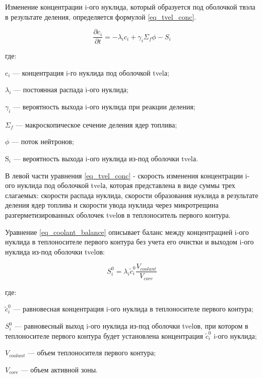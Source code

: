 Изменение концентрации i-ого нуклида, который образуется под оболочкой твэла в результате деления, определяется формулой 
\ref{eq_tvel_conc}.

\begin{equation}
    \label{eq_tvel_conc}
    \frac{\partial c_{i}}{\partial t} = -\lambda_{i}c_{i} + \gamma_{i}\Sigma_{f}\phi - S_{i}
\end{equation}

где:
\begin{description}
    \item $\text{c}_i$ --- концентрация i-го нуклида под оболочкой \ac{tvel}а;
    \item $\lambda_{i}$ ---  постоянная распада i-ого нуклида;
    \item $\gamma_{i}$ --- вероятность выхода i-ого нуклида при реакции деления;
    \item $\Sigma_{f}$ --- макроскопическое сечение деления ядер топлива;
    \item $\phi$ --- поток нейтронов;
    \item $\text{S}_{i}$ --- вероятность выхода i-ого нуклида из-под оболочки \ac{tvel}а.
\end{description}

В левой части уравнения \ref{eq_tvel_conc} - скорость изменения концентрации i-ого нуклида под оболочкой \ac{tvel}а, 
которая представлена в виде суммы трех слагаемых: скорости распада нуклида, скорости образования нуклида в результате 
деления ядер топлива и скорости увода нуклида через микротрещина разгерметизированных оболочек \ac{tvel}ов в 
теплоноситель первого контура.

Уравнение \ref{eq_coolant_balance} описывает баланс между концентрацией i-ого нуклида в теплоносителе первого контура 
без учета его очистки и выходом i-ого нуклида из-под оболочки \ac{tvel}ов:

\begin{equation}
    \label{eq_coolant_balance}
    S_{i}^{0} = \lambda_{i}\widetilde{c}_{i}^{0}\frac{V_{coolant}}{V_{core}}
\end{equation}

где:
\begin{description}
    \item $\widetilde{c}_{i}^{0}$ --- равновесная концентрация i-ого нуклида в теплоносителе первого контура;
    \item $S_{i}^{0}$ --- равновесный выход i-ого нуклида из-под оболочки \ac{tvel}ов, при котором в 
        теплоносителе первого контура будет установлена концентрация $\widetilde{c}_{i}^{0}$ i-ого нуклида;
    \item $V_{coolant}$ --- объем теплоносителя первого контура;
    \item $V_{core}$ --- объем активной зоны.
\end{description}

